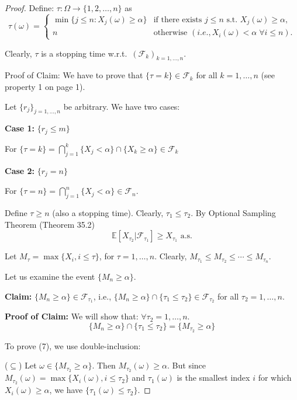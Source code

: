 \begin{proof}
Define: $\tau \colon \Omega \to \{1, 2, \ldots, n\}$ as
\[
\tau(\omega) = \begin{cases} 
\min \{j \leqslant n : X_j(\omega) \geq \alpha\} & \text{if there exists } j \leqslant n \text{ s.t. } X_j(\omega) \geq \alpha, \\
n & \text{otherwise } (i.e., X_i(\omega) < \alpha \; \forall i \leqslant n).
\end{cases}
\]

Clearly, $\tau$ is a stopping time w.r.t.\ $(\mathcal{F}_k)_{k=1,\ldots,n}$.

Proof of Claim: We have to prove that $\{\tau = k\} \in \mathcal{F}_k$ for all $k=1,\ldots,n$ (see property 1 on page 1).

Let $\{r_j\}_{j=1,\ldots,n}$ be arbitrary. We have two cases:

\textbf{Case 1:} $\{r_j \leqslant m\}$

For $\{\tau = k\} = \bigcap_{j=1}^k \{X_j < \alpha\} \cap \{X_k \geq \alpha\} \in \mathcal{F}_k$

\textbf{Case 2:} $\{r_j = n\}$

For $\{\tau = n\} = \bigcap_{j=1}^n \{X_j < \alpha\} \in \mathcal{F}_n$.

Define $\tau \geqslant n$ (also a stopping time). Clearly, $\tau_1 \leq \tau_2$. By Optional Sampling Theorem (Theorem 35.2)
\[
\mathbb{E}[X_{\tau_2} | \mathcal{F}_{\tau_1}] \geq X_{\tau_1} \text{ a.s.}
\]

Let $M_{\tau} = \max\{X_i, i \leq \tau\}$, for $\tau=1,\ldots,n$. Clearly, $M_{\tau_1} \leq M_{\tau_2} \leq \cdots \leq M_{\tau_n}$.

Let us examine the event $\{M_n \geq \alpha\}$.

\textbf{Claim:}
$\{M_n \geq \alpha\} \in \mathcal{F}_{\tau_1}$, i.e., $\{M_n \geq \alpha\} \cap \{\tau_1 \leq \tau_2\} \in \mathcal{F}_{\tau_2}$ for all $\tau_2 = 1, \ldots, n$.

\textbf{Proof of Claim:}
We will show that: $\forall \tau_2 = 1, \ldots, n$.
\[
\{M_n \geq \alpha\} \cap \{\tau_1 \leq \tau_2\} = \{M_{\tau_2} \geq \alpha\}
\]

To prove (7), we use double-inclusion:

($\subseteq$) Let $\omega \in \{M_{\tau_2} \geq \alpha\}$. Then $M_{\tau_2}(\omega) \geq \alpha$. But since $M_{\tau_2}(\omega) = \max\{X_i(\omega), i \leq \tau_2\}$ and $\tau_1(\omega)$ is the smallest index $i$ for which $X_i(\omega) \geq \alpha$, we have $\{\tau_1(\omega) \leq \tau_2\}$.


\end{proof}
